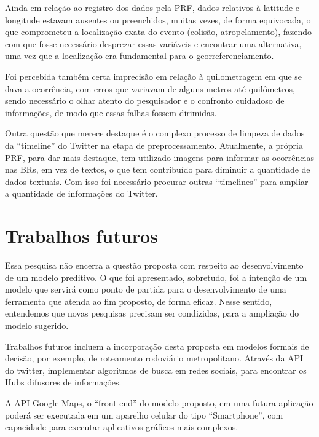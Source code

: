 Ainda em relação ao registro dos dados pela PRF, dados relativos à latitude e longitude estavam ausentes ou preenchidos, muitas vezes, de forma equivocada, o que comprometeu a localização exata do evento (colisão, atropelamento), fazendo com que fosse necessário desprezar essas variáveis e encontrar uma alternativa, uma vez que a localização era fundamental para o georreferenciamento.

Foi percebida também certa imprecisão em relação à quilometragem em que se dava a ocorrência, com erros que variavam de alguns metros até quilômetros, sendo necessário o olhar atento do pesquisador e o confronto cuidadoso de informações, de modo que essas falhas fossem dirimidas.

Outra questão que merece destaque é o complexo processo de limpeza de dados da ``timeline'' do Twitter na etapa de preprocessamento. Atualmente, a própria PRF, para dar mais destaque, tem utilizado imagens para informar as ocorrências nas BRs, em vez de textos, o que tem contribuído para diminuir a quantidade de dados textuais. Com isso foi necessário procurar outras ``timelines'' para ampliar a quantidade de informações do Twitter.

\pagebreak

\section{Trabalhos futuros}

Essa pesquisa não encerra a questão proposta com respeito ao desenvolvimento de um modelo preditivo. O que foi apresentado, sobretudo, foi a intenção de um modelo que servirá como ponto de partida para o desenvolvimento de uma ferramenta que atenda ao fim proposto, de forma eficaz. Nesse sentido, entendemos que novas pesquisas precisam ser condizidas, para a ampliação do modelo sugerido. 

Trabalhos futuros incluem a incorporação desta proposta em modelos formais de decisão, por exemplo, de roteamento
rodoviário metropolitano. Através da API do twitter, implementar algoritmos de busca em redes sociais, para encontrar os Hubs difusores de informações.

A API Google Maps, o ``front-end'' do modelo proposto, em uma futura aplicação poderá ser executada em um aparelho 
celular do tipo ``Smartphone'', com capacidade para executar aplicativos gráficos mais complexos.
